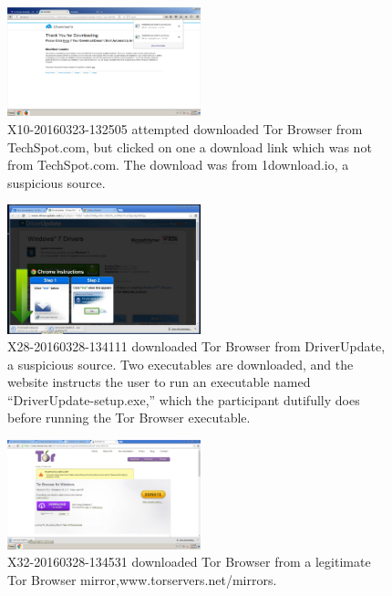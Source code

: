 \documentclass[USenglish,oneside,twocolumn]{article}
\begin{document}
\begin{figure}[h]
\label{downloadio}
\includegraphics[width=0.5\textwidth]{../experiment/processing/bad-participants/X10-20160323-132505-1downloadio.png}
\caption{X10-20160323-132505 attempted downloaded Tor Browser from TechSpot.com, but clicked on one 
a download link which was not from TechSpot.com. The download was from 1download.io, a suspicious source.}
\end{figure} 

\begin{figure}[h]
\label{driverupdate}
\includegraphics[width=0.5\textwidth]{../experiment/processing/bad-participants/X28-20160328-134111-driverupdate.png}
\caption{X28-20160328-134111 downloaded Tor Browser from DriverUpdate, a suspicious source. Two executables
are downloaded, and the website instructs the user to run an executable named ``DriverUpdate-setup.exe,'' which the
participant dutifully does before running the Tor Browser executable.}
\end{figure} 

\begin{figure}[h]
\label{mirror}
\includegraphics[width=0.5\textwidth]{../experiment/processing/bad-participants/X32-20160328-134531-mirror.png}
\caption{X32-20160328-134531 downloaded Tor Browser from a legitimate Tor Browser mirror,www.torservers.net/mirrors.}
\end{figure}
\end{document}
